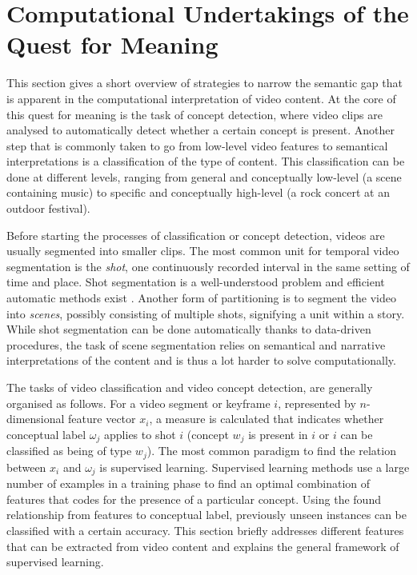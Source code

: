 
\section{Computational Undertakings of the Quest for Meaning}

This section gives a short overview of strategies to narrow the semantic gap that is apparent in the computational interpretation of video content. At the core of this quest for meaning is the task of concept detection\cite{Snoek:2009dq}, where video clips are analysed to automatically detect whether a certain concept is present. Another step that is commonly taken to go from low-level video features to semantical interpretations is a classification of the type of content. This classification can be done at different levels, ranging from general and conceptually low-level (a scene containing music) to specific and conceptually high-level (a rock concert at an outdoor festival)\cite{Wang:2000vf}.

Before starting the processes of classification or concept detection, videos are usually segmented into smaller clips. The most common unit for temporal video segmentation is the \emph{shot}, one continuously recorded interval in the same setting of time and place. Shot segmentation is a well-understood problem and efficient automatic methods exist \cite{springerlink:10.1007/BF01210504, Yuan:hu}. Another form of partitioning is to segment the video into \emph{scenes}, possibly consisting of multiple shots, signifying a unit within a story\cite{Wang:2000vf}. While shot segmentation can be done automatically thanks to data-driven procedures, the task of scene segmentation relies on semantical and narrative interpretations of the content and is thus a lot harder to solve computationally.

The tasks of video classification and video concept detection, are generally organised as follows. For a video segment or keyframe $i$, represented by $n$-dimensional feature vector $x_i$, a measure is calculated that indicates whether conceptual label $\omega_j$ applies to shot $i$ (concept $w_j$ is present in $i$ or  $i$ can be classified as being of type $w_j$). The most common paradigm to find the relation between $x_i$ and $\omega_j$ is supervised learning. Supervised learning methods use a large number of examples in a training phase to find an optimal combination of features that codes for the presence of a particular concept. Using the found relationship from features to conceptual label, previously unseen instances can be classified with a certain accuracy. This section briefly addresses different features that can be extracted from video content and explains the general framework of supervised learning.

